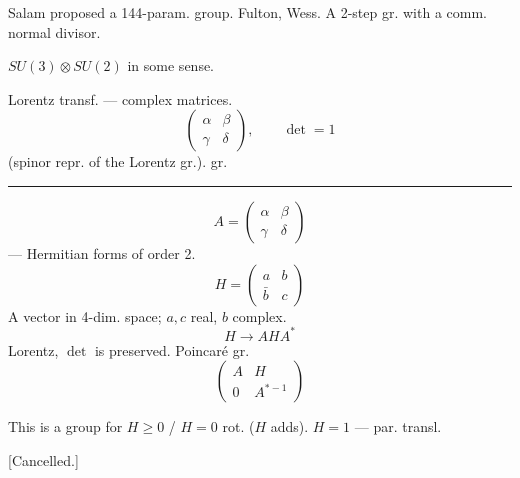 Salam proposed a 144-param. group.
Fulton, Wess.
A 2-step gr. with a comm. normal divisor.
\par\noindent\begin{minipage}{\linewidth}
$SU(3)\otimes SU(2)$ in some sense.
\end{minipage}\par
Lorentz transf. --- complex matrices.
\begin{equation*}
\begin{pmatrix}\alpha&\beta\\\gamma&\delta\end{pmatrix},
\qquad \det=1
\end{equation*}
(spinor repr. of the Lorentz gr.).
 gr.\enspace\rule[-.28em]{.6pt}{1.4em}
\begin{equation*}
A=\begin{pmatrix}\alpha&\beta\\\gamma&\delta\end{pmatrix}
\end{equation*}
 --- Hermitian forms of order 2.
\begin{equation*}
H=\begin{pmatrix}a&b\\\bar b&c\end{pmatrix}
\end{equation*}
A vector in 4-dim. space; $a,c$ real, $b$ complex.
\begin{equation*}
H\to AHA^*
\end{equation*}
Lorentz, $\det$ is preserved.
Poincar\'e gr.
\begin{equation*}
\begin{pmatrix}A&H\\0&A^{*-1}\end{pmatrix}
\end{equation*}
\par\noindent\begin{minipage}{\linewidth}
This is a group for $H\geq0$ / $H=0$ rot. ($H$ adds).
$H=1$ --- par. transl.
\end{minipage}\par
\par\noindent\begin{minipage}{\linewidth}
[Cancelled.]
\end{minipage}\par
